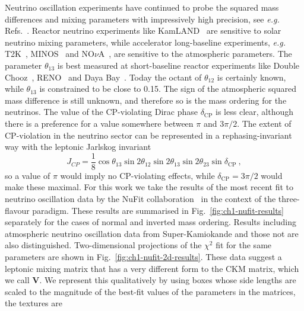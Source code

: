 Neutrino oscillation experiments have continued to probe the squared mass
differences and mixing parameters with impressively high precision, see
\textit{e.g.} Refs.~\cite{Capozzi:2017ipn, Esteban:2020cvm}. Reactor neutrino
experiments like KamLAND~\cite{Eguchi:2002dm} are sensitive to solar neutrino
mixing parameters, while accelerator long-baseline experiments, \textit{e.g.}
T2K~\cite{Abe:2015awa}, MINOS~\cite{Evans:2013pka} and
NO$\nu$A~\cite{Adamson:2017qqn}, are sensitive to the atmospheric parameters.
The parameter $\theta_{13}$ is best measured at short-baseline reactor
experiments like Double Chooz~\cite{Ardellier:2006mn}, RENO~\cite{Ahn:2010vy}
and Daya Bay~\cite{An:2015qga}. Today the octant of $\theta_{12}$ is certainly
known, while $\theta_{13}$ is constrained to be close to 0.15. The sign of the
atmospheric squared mass difference is still unknown, and therefore so is the
mass ordering for the neutrinos. The value of the CP-violating Dirac phase
$\delta_{\text{CP}}$ is less clear, although there is a preference for a value
somewhere between $\pi$ and $3\pi/2$. The extent of CP-violation in the neutrino
sector can be represented in a rephasing-invariant way with the leptonic
Jarlskog invariant~\cite{PhysRevLett.55.1039}
\begin{equation}
  J_{CP} = \frac{1}{8} \cos \theta_{13} \sin 2\theta_{12} \sin 2\theta_{13} \sin 2\theta_{23} \sin \delta_{\text{CP}} \ ,
\end{equation}
so a value of $\pi$ would imply no CP-violating effects, while
$\delta_{\text{CP}} = 3\pi/2$ would make these maximal. For this work we take
the results of the most recent fit to neutrino oscillation data by the NuFit
collaboration~\cite{Esteban:2020cvm, nufitweb} in the context of the
three-flavour paradigm. These results are summarised in
Fig.~\ref{fig:ch1-nufit-results} separately for the cases of normal and inverted
mass ordering. Results including atmospheric neutrino oscillation data from
Super-Kamiokande and those not are also distinguished. Two-dimensional
projections of the $\chi^{2}$ fit for the same parameters are shown in
Fig.~\ref{fig:ch1-nufit-2d-results}. These data suggest a leptonic mixing matrix
that has a very different form to the CKM matrix, which we call $\mathbf{V}$.
We represent this qualitatively by using boxes whose side lengths are scaled
to the magnitude of the best-fit values of the parameters in the matrices, the
textures are
